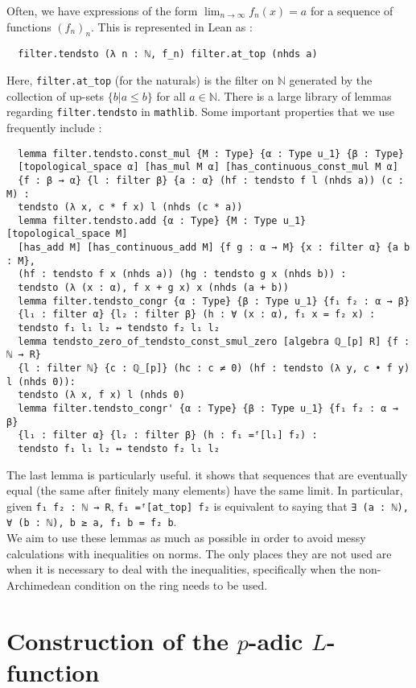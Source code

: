 \documentclass[a4paper,UKenglish,cleveref, autoref, thm-restate]{lipics-v2021}
\newcommand{\lean}[1]{\texttt{#1}\xspace} %
\begin{document}
Often, we have expressions of the form $\lim_{n \to \infty} f_n(x) = a$ for a sequence of functions $(f_n)_n$. 
This is represented in Lean as :
\begin{lstlisting}
  filter.tendsto (λ n : ℕ, f_n) filter.at_top (nhds a)
\end{lstlisting}
Here, \lean{filter.at\_top} (for the naturals) is the filter on $\mathbb{N}$ generated by the collection of up-sets $\{ b | a \leq b \}$ 
for all $a \in \mathbb{N}$. There is a large library of lemmas regarding \lean{filter.tendsto} in \lean{mathlib}. 
Some important properties that we use frequently include :
\begin{lstlisting}
  lemma filter.tendsto.const_mul {M : Type} {α : Type u_1} {β : Type} 
  [topological_space α] [has_mul M α] [has_continuous_const_mul M α] 
  {f : β → α} {l : filter β} {a : α} (hf : tendsto f l (nhds a)) (c : M) :
  tendsto (λ x, c * f x) l (nhds (c * a))
  lemma filter.tendsto.add {α : Type} {M : Type u_1} [topological_space M] 
  [has_add M] [has_continuous_add M] {f g : α → M} {x : filter α} {a b : M}, 
  (hf : tendsto f x (nhds a)) (hg : tendsto g x (nhds b)) : 
  tendsto (λ (x : α), f x + g x) x (nhds (a + b))
  lemma filter.tendsto_congr {α : Type} {β : Type u_1} {f₁ f₂ : α → β} 
  {l₁ : filter α} {l₂ : filter β} (h : ∀ (x : α), f₁ x = f₂ x) : 
  tendsto f₁ l₁ l₂ ↔ tendsto f₂ l₁ l₂
  lemma tendsto_zero_of_tendsto_const_smul_zero [algebra ℚ_[p] R] {f : ℕ → R} 
  {l : filter ℕ} {c : ℚ_[p]} (hc : c ≠ 0) (hf : tendsto (λ y, c • f y) l (nhds 0)):
  tendsto (λ x, f x) l (nhds 0) 
  lemma filter.tendsto_congr' {α : Type} {β : Type u_1} {f₁ f₂ : α → β} 
  {l₁ : filter α} {l₂ : filter β} (h : f₁ =ᶠ[l₁] f₂) : 
  tendsto f₁ l₁ l₂ ↔ tendsto f₂ l₁ l₂
\end{lstlisting}

The last lemma is particularly useful. it shows that sequences that are eventually equal (the same after finitely many 
elements) have the same limit. In particular, given \lean{f₁ f₂ : ℕ → R}, \lean{f₁ =ᶠ[at\_top] f₂} is equivalent to saying that 
\lean{∃ (a : ℕ), ∀ (b : ℕ), b ≥ a, f₁ b = f₂ b}. \\

We aim to use these lemmas as much as possible in order to avoid messy calculations with inequalities on norms. The only places they are 
not used are when it is necessary to deal with the inequalities, specifically when the non-Archimedean condition on the ring needs to be used.

\section{Construction of the $p$-adic $L$-function}
\end{document}
